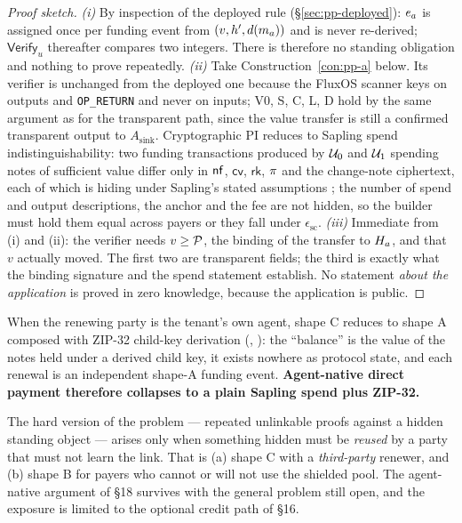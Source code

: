 \begin{proof}[Proof sketch]
\emph{(i)} By inspection of the deployed rule (\S\ref{sec:pp-deployed}): $e_{a}$ is assigned once per
funding event from $(v, h', d(m_{a}))$ and is never re-derived; $\mathsf{Verify}_u$ thereafter
compares two integers. There is therefore no standing obligation and nothing to prove repeatedly.
\emph{(ii)} Take Construction~\ref{con:pp-a} below. Its verifier is unchanged from the deployed one
because the FluxOS scanner keys on outputs and \texttt{OP\_RETURN} and never on inputs; V0, S, C, L, D
hold by the same argument as for the transparent path, since the value transfer is still a confirmed
transparent output to $A_{\mathrm{sink}}$. Cryptographic PI reduces to Sapling spend
indistinguishability: two funding transactions produced by $\mathcal{U}_0$ and $\mathcal{U}_1$ spending
notes of sufficient value differ only in $\mathsf{nf}$, $\mathsf{cv}$, $\mathsf{rk}$, $\pi$ and the
change-note ciphertext, each of which is hiding under Sapling's stated assumptions
\citep{zcashprotocol}; the number of spend and output descriptions, the anchor and the fee are not
hidden, so the builder must hold them equal across payers or they fall under $\epsilon_{\mathrm{sc}}$.
\emph{(iii)} Immediate from (i) and (ii): the verifier needs $v \ge \mathcal{P}$,
the binding of the transfer to $H_{a}$, and that $v$ actually moved. The first two are transparent
fields; the third is exactly what the binding signature and the spend statement establish. No
statement \emph{about the application} is proved in zero knowledge, because the application is public.
\end{proof}

\begin{corollary}
\label{cor:pp-agent}
When the renewing party is the tenant's own agent, shape C reduces to shape A composed with ZIP-32
child-key derivation (\shipped, ): the ``balance'' is the
value of the notes held under a derived child key, it exists nowhere as protocol state, and each
renewal is an independent shape-A funding event. \textbf{Agent-native direct payment therefore
collapses to a plain Sapling spend plus ZIP-32.}
\end{corollary}

\begin{corollary}
\label{cor:pp-blast}
The hard version of the problem --- repeated unlinkable proofs against a hidden standing object ---
arises only when something hidden must be \emph{reused} by a party that must not learn the link. That
is (a) shape C with a \emph{third-party} renewer, and (b) shape B for payers who cannot or will not
use the shielded pool. The agent-native argument of \S18 survives with the general problem still open,
and the exposure is limited to the optional credit path of \S16.
\end{corollary}

